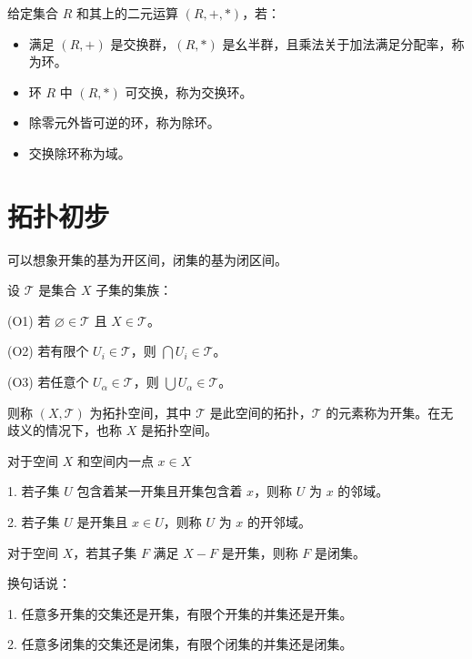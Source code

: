 \begin{definition}[环，域]
	给定集合 $R$ 和其上的二元运算 $(R, +, \ast)$，若：

	\begin{itemize}
		\item 满足 $(R, +)$ 是交换群，$(R, \ast)$ 是幺半群，且乘法关于加法满足分配率，称为环。

		\item 环 $R$ 中 $(R, \ast)$ 可交换，称为交换环。

		\item 除零元外皆可逆的环，称为除环。

		\item 交换除环称为域。
	\end{itemize}
\end{definition}

\section{拓扑初步}

可以想象开集的基为开区间，闭集的基为闭区间。

\begin{definition}[拓扑空间]
	设 $\mathcal{T}$ 是集合 $X$ 子集的集族：

	(O1) 若 $\varnothing \in \mathcal{T}$ 且 $X \in \mathcal{T}$。

	(O2) 若有限个 $U_i \in \mathcal{T}$，则 $\bigcap U_i \in \mathcal{T}$。

	(O3) 若任意个 $U_\alpha \in \mathcal{T}$，则 $\bigcup {U_\alpha} \in \mathcal{T}$。

	则称 $(X, \mathcal{T})$ 为拓扑空间，其中 $\mathcal{T}$ 是此空间的拓扑，$\mathcal{T}$ 的元素称为开集。在无歧义的情况下，也称 $X$ 是拓扑空间。
\end{definition}

\begin{definition}[邻域]
	对于空间 $X$ 和空间内一点 $x \in X$

	1. 若子集 $U$ 包含着某一开集且开集包含着 $x$，则称 $U$ 为 $x$ 的邻域。

	2. 若子集 $U$ 是开集且 $x \in U$，则称 $U$ 为 $x$ 的开邻域。
\end{definition}

\begin{definition}[闭集]
	对于空间 $X$，若其子集 $F$ 满足 $X-F$ 是开集，则称 $F$ 是闭集。
\end{definition}

\begin{example}
	换句话说：

	1. 任意多开集的交集还是开集，有限个开集的并集还是开集。

	2. 任意多闭集的交集还是闭集，有限个闭集的并集还是闭集。
\end{example}

